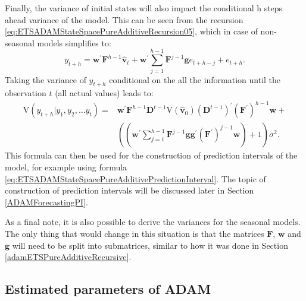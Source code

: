 \documentclass[]{book}
\theoremstyle{definition}
\theoremstyle{definition}
\theoremstyle{definition}
\theoremstyle{definition}
\theoremstyle{remark}
\begin{document}
Finally, the variance of initial states will also impact the conditional h steps ahead variance of the model. This can be seen from the recursion \eqref{eq:ETSADAMStateSpacePureAdditiveRecursion05}, which in case of non-seasonal models simplifies to:
\begin{equation}
    y_{t+h} = \mathbf{w}^\prime \mathbf{F}^{h-1} \hat{\mathbf{v}}_{t} + \mathbf{w}^\prime \sum_{j=1}^{h-1} \mathbf{F}^{j-1} \mathbf{g} e_{t+h-j} + e_{t+h} .
  \label{eq:ETSADAMStateSpacePureAdditiveForecastVariance01}
\end{equation}
Taking the variance of \(y_{t+h}\) conditional on the all the information until the observation \(t\) (all actual values) leads to:
\begin{equation}
    \begin{aligned}
    \mathrm{V}( y_{t+h} | y_1, y_2, \dots y_t) = & \mathbf{w}^\prime \mathbf{F}^{h-1} \mathbf{D}^{t-1} \mathrm{V}\left( \hat{\mathbf{v}}_{0} \right) \left(\mathbf{D}^{t-1}\right)^\prime (\mathbf{F}^\prime)^{h-1} \mathbf{w} + \\
                                                 & \left( \left(\mathbf{w}^\prime \sum_{j=1}^{h-1} \mathbf{F}^{j-1} \mathbf{g} \mathbf{g}^\prime (\mathbf{F}^\prime)^{j-1} \mathbf{w} \right) + 1 \right) \sigma^2 .
    \end{aligned}
  \label{eq:ETSADAMStateSpacePureAdditiveForecastVariance02}
\end{equation}
This formula can then be used for the construction of prediction intervals of the model, for example using formula \eqref{eq:ETSADAMStateSpacePureAdditivePredictionInterval}. The topic of construction of prediction intervals will be discussed later in Section \ref{ADAMForecastingPI}.

As a final note, it is also possible to derive the variances for the seasonal models. The only thing that would change in this situation is that the matrices \(\mathbf{F}\), \(\mathbf{w}\) and \(\mathbf{g}\) will need to be split into submatrices, similar to how it was done in Section \ref{adamETSPureAdditiveRecursive}.

\hypertarget{estimated-parameters-of-adam}{%
\subsection{Estimated parameters of ADAM}\label{estimated-parameters-of-adam}}
\end{document}
